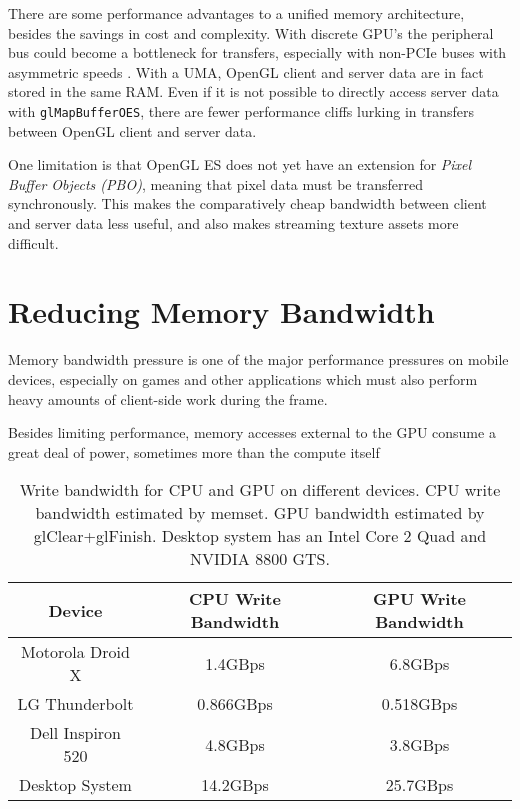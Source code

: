 There are some performance advantages to a unified memory architecture, besides
the savings in cost and complexity.  With discrete GPU's the peripheral bus
could become a bottleneck for transfers, especially with non-PCIe buses with
asymmetric speeds \cite{Elhasson05}.  With a UMA, OpenGL client and server data
are in fact stored in the same RAM.  Even if it is not possible to directly
access server data with \texttt{glMapBufferOES}, there are fewer performance
cliffs lurking in transfers between OpenGL client and server data.


One limitation is that OpenGL ES does not yet have an extension for
\textit{Pixel Buffer Objects (PBO)}, meaning that pixel data must be
transferred synchronously.  This makes the comparatively cheap bandwidth
between client and server data less useful, and also makes streaming texture
assets more difficult.

\section{Reducing Memory
Bandwidth}\label{Jon-McCaffrey:Reducing-Memory-Bandwidth}


Memory bandwidth pressure is one of the major performance pressures on mobile
devices, especially on games and other applications which must also perform
heavy amounts of client-side work during the frame.

Besides limiting performance, memory accesses external to the GPU consume a
great deal of power, sometimes more than the compute itself \cite{Antochi04}

\begin{table}[htb]\centering \begin{tabular}{|c|c|c|} 
\hline \small{Device} & \small{CPU Write Bandwidth} & \small{GPU Write Bandwidth}   \\ \hline 
\hline \small{Motorola Droid X} & \small{1.4GBps} & \small{6.8GBps} \\ 
\hline \small{LG Thunderbolt} & \small{0.866GBps} & \small{0.518GBps} \\ 
\hline \small{Dell Inspiron 520} & \small{4.8GBps} & \small{3.8GBps} \\ 
\hline \small{Desktop System} & \small{14.2GBps} & \small{25.7GBps}\\
\hline
\end{tabular} 
\caption{Write bandwidth for CPU and GPU on different devices.  CPU write bandwidth estimated by memset.  GPU bandwidth estimated by glClear+glFinish.  Desktop system has an Intel Core 2 Quad and NVIDIA 8800 GTS.}
\label{JonMcCaffrey:bandwidth} \end{table}

